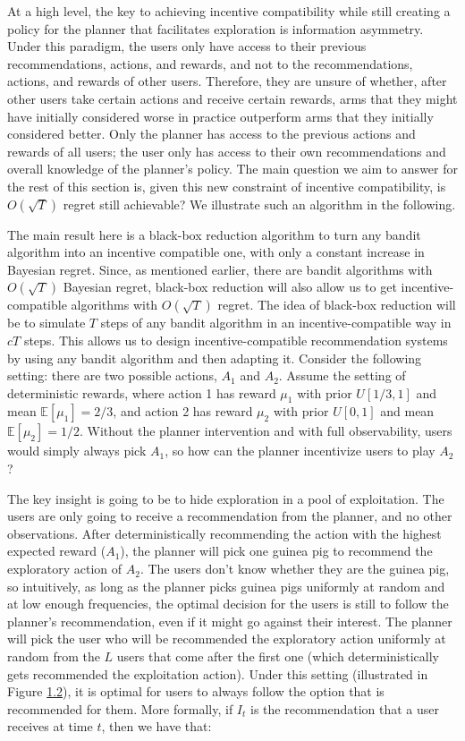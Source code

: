 \documentclass[
  letterpaper,
  numbers=noenddot,
  DIV=11]{scrreprt}
\theoremstyle{plain}
\theoremstyle{definition}
\theoremstyle{remark}
\begin{document}
At a high level, the key to achieving incentive compatibility while
still creating a policy for the planner that facilitates exploration is
information asymmetry. Under this paradigm, the users only have access
to their previous recommendations, actions, and rewards, and not to the
recommendations, actions, and rewards of other users. Therefore, they
are unsure of whether, after other users take certain actions and
receive certain rewards, arms that they might have initially considered
worse in practice outperform arms that they initially considered better.
Only the planner has access to the previous actions and rewards of all
users; the user only has access to their own recommendations and overall
knowledge of the planner's policy. The main question we aim to answer
for the rest of this section is, given this new constraint of incentive
compatibility, is \(O(\sqrt{T})\) regret still achievable? We illustrate
such an algorithm in the following.

The main result here is a black-box reduction algorithm to turn any
bandit algorithm into an incentive compatible one, with only a constant
increase in Bayesian regret. Since, as mentioned earlier, there are
bandit algorithms with \(O(\sqrt{T})\) Bayesian regret, black-box
reduction will also allow us to get incentive-compatible algorithms with
\(O(\sqrt{T})\) regret. The idea of black-box reduction will be to
simulate \(T\) steps of any bandit algorithm in an incentive-compatible
way in \(c T\) steps. This allows us to design incentive-compatible
recommendation systems by using any bandit algorithm and then adapting
it. Consider the following setting: there are two possible actions,
\(A_1\) and \(A_2\). Assume the setting of deterministic rewards, where
action 1 has reward \(\mu_1\) with prior \(U[1/3, 1]\) and mean
\(\mathbb{E}[\mu_1] = 2/3\), and action 2 has reward \(\mu_2\) with
prior \(U[0, 1]\) and mean \(\mathbb{E}[\mu_2] = 1/2\). Without the
planner intervention and with full observability, users would simply
always pick \(A_1\), so how can the planner incentivize users to play
\(A_2\)?

The key insight is going to be to hide exploration in a pool of
exploitation. The users are only going to receive a recommendation from
the planner, and no other observations. After deterministically
recommending the action with the highest expected reward (\(A_1\)), the
planner will pick one guinea pig to recommend the exploratory action of
\(A_2\). The users don't know whether they are the guinea pig, so
intuitively, as long as the planner picks guinea pigs uniformly at
random and at low enough frequencies, the optimal decision for the users
is still to follow the planner's recommendation, even if it might go
against their interest. The planner will pick the user who will be
recommended the exploratory action uniformly at random from the \(L\)
users that come after the first one (which deterministically gets
recommended the exploitation action). Under this setting (illustrated in
Figure \hyperref[fig-deterministic-guinea-pig]{1.2}), it is optimal for
users to always follow the option that is recommended for them. More
formally, if \(I_t\) is the recommendation that a user receives at time
\(t\), then we have that:
\end{document}
